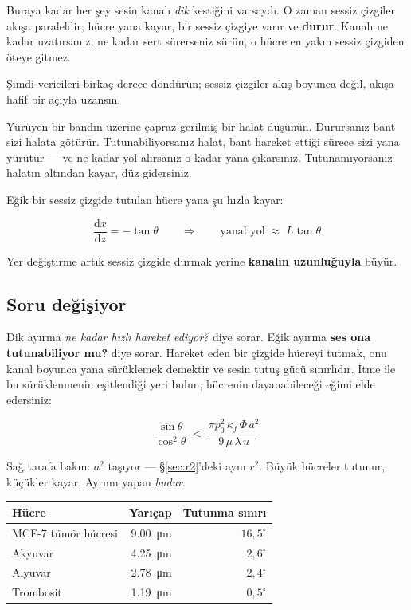 \documentclass[11pt,a4paper]{article}
\begin{document}
Buraya kadar her şey sesin kanalı \emph{dik} kestiğini varsaydı. O zaman sessiz
çizgiler akışa paraleldir; hücre yana kayar, bir sessiz çizgiye varır ve
\textbf{durur}. Kanalı ne kadar uzatırsanız, ne kadar sert sürerseniz sürün, o
hücre en yakın sessiz çizgiden öteye gitmez.

Şimdi vericileri birkaç derece döndürün; sessiz çizgiler akış boyunca değil,
akışa hafif bir açıyla uzansın.

\begin{analogy}
Yürüyen bir bandın üzerine çapraz gerilmiş bir halat düşünün. Durursanız bant
sizi halata götürür. Tutunabiliyorsanız halat, bant hareket ettiği sürece sizi
yana yürütür --- ve ne kadar yol alırsanız o kadar yana çıkarsınız.
Tutunamıyorsanız halatın altından kayar, düz gidersiniz.
\end{analogy}

Eğik bir sessiz çizgide tutulan hücre yana şu hızla kayar:

\begin{equation}
\frac{\mathrm{d}x}{\mathrm{d}z} = -\tan\theta
\qquad\Longrightarrow\qquad
\text{yanal yol} \;\approx\; L\tan\theta
\label{eq:tilt-drift}
\end{equation}

Yer değiştirme artık sessiz çizgide durmak yerine \textbf{kanalın uzunluğuyla}
büyür.

\subsection*{Soru değişiyor}

Dik ayırma \emph{ne kadar hızlı hareket ediyor?} diye sorar. Eğik ayırma
\textbf{ses ona tutunabiliyor mu?} diye sorar. Hareket eden bir çizgide hücreyi
tutmak, onu kanal boyunca yana sürüklemek demektir ve sesin tutuş gücü sınırlıdır.
İtme ile bu sürüklenmenin eşitlendiği yeri bulun, hücrenin dayanabileceği eğimi
elde edersiniz:

\begin{equation}
\frac{\sin\theta}{\cos^{2}\theta} \;\le\;
\frac{\pi p_0^2\,\kappa_f\,\Phi\,a^2}{9\,\mu\,\lambda\,u}
\label{eq:trap}
\end{equation}

Sağ tarafa bakın: $a^2$ taşıyor --- \S\ref{sec:r2}'deki aynı $r^2$. Büyük
hücreler tutunur, küçükler kayar. Ayrımı yapan \emph{budur}.

\begin{center}\small
\begin{tabular}{lrr}
\toprule
Hücre & Yarıçap & Tutunma sınırı \\
\midrule
MCF-7 tümör hücresi & \SI{9,00}{\micro\metre} & $16,5^\circ$ \\
Akyuvar & \SI{4,25}{\micro\metre} & $2,6^\circ$ \\
Alyuvar & \SI{2,78}{\micro\metre} & $2,4^\circ$ \\
Trombosit & \SI{1,19}{\micro\metre} & $0,5^\circ$ \\
\bottomrule
\end{tabular}
\end{center}
\end{document}

